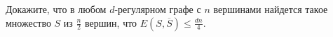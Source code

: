 Докажите, что в любом $d$-регулярном графе с $n$ вершинами найдется такое множество $S$ из $\frac{n}{2}$
вершин, что $E(S, \overline{S}) \le \frac{d n}{4}$.
